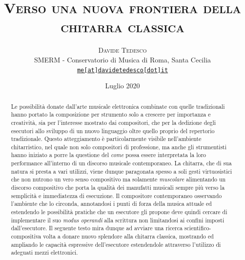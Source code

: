 \documentclass[oneside]{article}
\title{\vspace{-15mm}\fontsize{24pt}{10pt}\selectfont\textsf{\bfseries{\textsc{Verso una nuova frontiera della
 chitarra classica}}}} %
\author{
\large
\textsc{Davide Tedesco}\\
\small{SMERM - Conservatorio di Musica di Roma, Santa Cecilia}\\
\small \href{mailto:me@davidetedesco.it}{\texttt{me[at]davidetedesco[dot]it}} 
}
\date{Luglio 2020}
\begin{document}
\maketitle %

\tableofcontents

\thispagestyle{empty} 


\begin{abstract}

Le possibilità donate dall'arte musicale elettronica combinate con quelle tradizionali hanno portato la composizione per strumento solo a crescere per importanza e creatività, sia per l'interesse mostrato dai compositori, che per la dedizione degli esecutori allo sviluppo di un nuovo linguaggio oltre quello proprio del repertorio tradizionale. Questo atteggiamento è particolarmente visibile nell'ambiente chitarristico, nel quale non solo compositori di professione, ma anche gli strumentisti hanno iniziato a porre la questione del \textit{come} possa essere interpretata la loro performance all'interno di un discorso musicale contemporaneo. La chitarra, che di sua natura si presta a vari utilizzi, viene dunque paragonata spesso a soli gesti virtuosistici che non nutrono un vero senso compositivo ma solamente \textit{muscolare} alimentando un discorso compositivo che porta la qualità dei manufatti musicali sempre più verso la semplicità e immediatezza di esecuzione. Il compositore contemporaneo osservando l'ambiente che lo circonda, annotandosi i punti di forza della musica attuale ed estendendo le possibilità pratiche che un esecutore gli propone deve quindi cercare di implementare il suo \textit{modus operandi} alla scrittura non limitandosi ai confini imposti dall'esecutore. Il seguente testo mira dunque ad avviare una ricerca scientifico-compositiva volta a donare nuovo splendore alla chitarra classica, mostrando ed ampliando le capacità espressive dell'esecutore estendendole attraverso l'utilizzo di adeguati mezzi elettronici.

\end{abstract}
\end{document}
